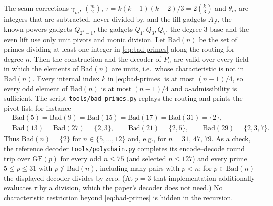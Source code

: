 The seam corrections $\gamma_m$,
$\binom m2$, $\tau=k(k-1)(k-2)/3=2\binom k3$ and $\theta_m$ are integers
that are subtracted, never divided by, and the fill gadgets $A_{2^l}$, the
known-powers gadgets $Q_{2^k-1}$, the gadgets
$Q_1,Q_3,Q_7$, the degree-$3$ base and the even lift use only unit pivots
and monic division.  Let $\mathrm{Bad}(n)$ be the set of primes dividing at
least one integer in \eqref{eq:bad-primes} along the routing for degree
$n$.  Then the construction and the decoder of $P_n$ are valid over every
field in which the elements of $\mathrm{Bad}(n)$ are units, i.e.\ whose
characteristic is not in $\mathrm{Bad}(n)$.  Every internal index $k$ in
\eqref{eq:bad-primes} is at most $(n-1)/4$, so every odd element of
$\mathrm{Bad}(n)$ is at most $(n-1)/4$ and $n$-admissibility is sufficient.
The script \texttt{tools/bad\_primes.py} replays the routing and prints
the pivot list; for instance
\[
\begin{aligned}
  &\mathrm{Bad}(5)=\mathrm{Bad}(9)=\mathrm{Bad}(15)=\mathrm{Bad}(17)
    =\mathrm{Bad}(31)=\{2\},\\
  &\mathrm{Bad}(13)=\mathrm{Bad}(27)=\{2,3\},\qquad
  \mathrm{Bad}(21)=\{2,5\},\qquad
  \mathrm{Bad}(29)=\{2,3,7\}.
\end{aligned}
\]
Thus $\mathrm{Bad}(n)=\{2\}$ for $n\in\{5,\dots,12\}$ and, e.g., for
$n=31,\,47,\,79$.  As a check, the reference decoder
\texttt{tools/polychain.py} completes its encode--decode round trip over
$\mathrm{GF}(p)$ for every odd $n\le75$ (and selected $n\le127$) and
every prime $5\le p\le31$ with $p\notin\mathrm{Bad}(n)$, including many
pairs with $p<n$; for $p\in\mathrm{Bad}(n)$ the displayed decoder divides
by zero.  (At $p=3$ that implementation additionally evaluates $\tau$ by a
division, which the paper's decoder does not need.)
No characteristic restriction beyond \eqref{eq:bad-primes} is hidden in
the recursion.
